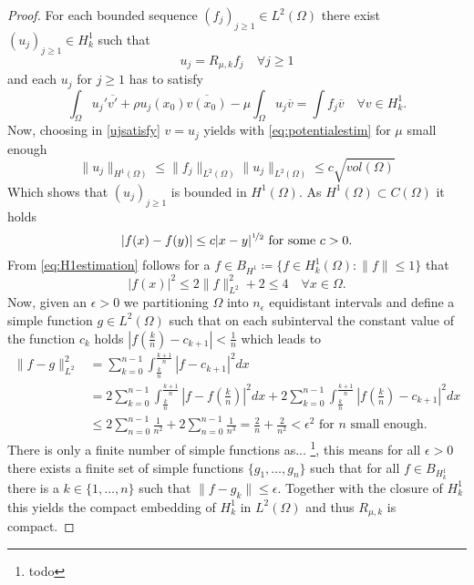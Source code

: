 \begin{theorem}
	\begin{proof}
	For each bounded sequence $(f_{j})_{j \geq 1} \in L^{2}(\Omega)$ there exist $(u_{j})_{j \geq 1} \in H^{1}_{k}$ such that
		\[ u_{j} = R_{\mu, k} f_{j} \quad \forall j \geq 1 \]
	and each $u_{j}$ for $j \geq 1$ has to satisfy
		\begin{equation}
			\int_{\Omega} u_{j}' \overline{v'} + \rho u_{j}(x_{0}) \overline{v(x_{0})} - \mu \int_{\Omega} u_{j} \overline{v} = \int f_{j} \overline{v} \quad \forall v \in H^{1}_{k}. \label{ujsatisfy}
		\end{equation} 
	Now, choosing in \eqref{ujsatisfy} $v = u_{j}$ yields with \eqref{eq:potentialestim} for $\mu$ small enough
		\[  \| u_{j} \|_{H^{1}(\Omega)} \leq \| f_{j} \|_{L^{2}(\Omega)} \| u_{j} \|_{L^{2}(\Omega)} \leq c \sqrt{vol(\Omega)} \]
	Which shows that $(u_{j})_{j \geq 1}$ is bounded in $H^{1}(\Omega)$. As $H^1(\Omega) \subset C(\Omega)$ it holds
		\begin{equation}
			|f(x) - f(y)| \leq c |x - y|^{\nicefrac{1}{2}} \text{ for some } c > 0. \label{eq:H1estimation}
		\end{equation}  
		From \eqref{eq:H1estimation} follows for a $f \in B_{H^{1}} \coloneqq \{ f \in H^{1}_{k}(\Omega) : \| f \| \leq 1 \}$ that 
		\[ |f(x)|^{2} \leq 2 \| f \|^{2}_{L^{2}} + 2 \leq 4 \quad \forall x \in \Omega. \]
		Now, given an $\epsilon > 0$ we partitioning $\Omega$ into $n_{\epsilon}$ equidistant intervals and define a simple function $g \in L^{2}(\Omega)$ such that on each subinterval the constant value of the function $c_{k}$ holds $|f(\frac{k}{n}) - c_{k + 1}| < \frac{1}{n}$ which leads to
		\begin{align*}
			\| f - g \|^{2}_{L^{2}} & = \sum_{k = 0}^{n-1} \int_{\frac{k}{n}}^{\frac{k+1}{n}} | f - c_{k+1} |^{2} dx \\
				& =  2 \sum_{k = 0}^{n-1} \int_{\frac{k}{n}}^{\frac{k+1}{n}} | f - f(\frac{k}{n}) |^{2} dx +  2 \sum_{k = 0}^{n-1} \int_{\frac{k}{n}}^{\frac{k+1}{n}} | f(\frac{k}{n}) - c_{k+1} |^{2} dx \\
				& \leq 2 \sum_{n = 0}^{n-1} \frac{1}{n^{2}} + 2 \sum_{n=0}^{n-1} \frac{1}{n^{3}} = \frac{2}{n} + \frac{2}{n^{2}} < \epsilon^{2} \text{ for } n \text{ small enough.}
		\end{align*}		 
		There is only a finite number of simple functions as... \footnote{todo}, this means for all $\epsilon > 0$ there exists a finite set of simple functions $\{ g_{1}, \dotsc, g_{n} \}$ such that for all $f \in B_{H^{1}_{k}}$ there is a $k \in \{1, \dotsc, n\}$ such that $\| f - g_{k} \| \leq \epsilon$. Together with the closure of $H^{1}_{k}$ this yields the compact embedding of $H^{1}_{k}$ in $L^{2}(\Omega)$ and thus $R_{\mu, k}$ is compact.
	\end{proof}	
\end{theorem}

